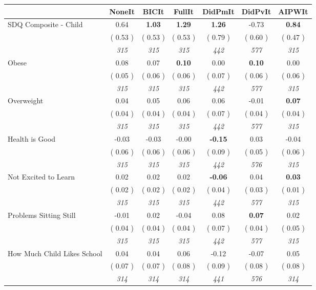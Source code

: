 \begin{tabular}{l c c c c c c}
\toprule
 & NoneIt & BICIt & FullIt & DidPmIt & DidPvIt & AIPWIt \\
\midrule
SDQ Composite - Child &      0.64 & \textbf{      1.03 } & \textbf{      1.29 } & \textbf{      1.26 } &     -0.73 & \textbf{     0.84} \\
& (     0.53 ) & (     0.53 ) & (     0.53 ) & (     0.79 ) & (     0.60 ) & (     0.47 ) \\
& \textit{ 315 } & \textit{ 315 } & \textit{ 315 } & \textit{ 442 } & \textit{ 577 } & \textit{ 315 } \\
Obese &      0.08 &      0.07 & \textbf{      0.10 } &      0.00 & \textbf{      0.10 } &      0.00 \\
& (     0.05 ) & (     0.06 ) & (     0.06 ) & (     0.07 ) & (     0.06 ) & (     0.06 ) \\
& \textit{ 315 } & \textit{ 315 } & \textit{ 315 } & \textit{ 442 } & \textit{ 577 } & \textit{ 315 } \\
Overweight &      0.04 &      0.05 &      0.06 &      0.06 &     -0.01 & \textbf{     0.07} \\
& (     0.04 ) & (     0.04 ) & (     0.04 ) & (     0.07 ) & (     0.04 ) & (     0.04 ) \\
& \textit{ 315 } & \textit{ 315 } & \textit{ 315 } & \textit{ 442 } & \textit{ 577 } & \textit{ 315 } \\
Health is Good &     -0.03 &     -0.03 &     -0.00 & \textbf{     -0.15 } &      0.03 &     -0.04 \\
& (     0.06 ) & (     0.06 ) & (     0.06 ) & (     0.09 ) & (     0.05 ) & (     0.06 ) \\
& \textit{ 315 } & \textit{ 315 } & \textit{ 315 } & \textit{ 442 } & \textit{ 576 } & \textit{ 315 } \\
Not Excited to Learn &      0.02 &      0.02 &      0.02 & \textbf{     -0.06 } &      0.04 & \textbf{     0.03} \\
& (     0.02 ) & (     0.02 ) & (     0.02 ) & (     0.04 ) & (     0.03 ) & (     0.01 ) \\
& \textit{ 315 } & \textit{ 315 } & \textit{ 315 } & \textit{ 442 } & \textit{ 577 } & \textit{ 315 } \\
Problems Sitting Still &     -0.01 &      0.02 &     -0.04 &      0.08 & \textbf{      0.07 } &      0.02 \\
& (     0.04 ) & (     0.04 ) & (     0.04 ) & (     0.07 ) & (     0.04 ) & (     0.05 ) \\
& \textit{ 315 } & \textit{ 315 } & \textit{ 315 } & \textit{ 442 } & \textit{ 577 } & \textit{ 315 } \\
How Much Child Likes School &      0.04 &      0.04 &      0.06 &     -0.12 &     -0.07 &      0.05 \\
& (     0.07 ) & (     0.07 ) & (     0.08 ) & (     0.09 ) & (     0.08 ) & (     0.08 ) \\
& \textit{ 314 } & \textit{ 314 } & \textit{ 314 } & \textit{ 441 } & \textit{ 576 } & \textit{ 314 } \\
\bottomrule
\end{tabular}
